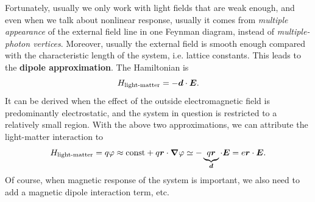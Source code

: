 \documentclass[hyperref, a4paper, 12pt]{report}
\newcommand*{\const}{\mathrm{const}}
\newcommand*{\concept}[1]{{\textbf{#1}}}
\begin{document}
Fortunately, usually we only work with light fields 
that are weak enough,
and even when we talk about nonlinear response,
usually it comes from \emph{multiple appearance} of the external field line in one Feynman diagram,
instead of \emph{multiple-photon vertices}.
Moreover, usually the external field is smooth enough 
compared with the characteristic length of the system, i.e. lattice constants.
This leads to the \concept{dipole approximation}.
The Hamiltonian is 
\begin{equation}
    H_{\text{light-matter}} = - \vb*{d} \cdot \vb*{E}.
\end{equation}
It can be derived when the effect of the outside electromagnetic field is predominantly electrostatic,
and the system in question is restricted to a relatively small region.
With the above two approximations,
we can attribute the light-matter interaction to 
\begin{equation}
    H_{\text{light-matter}} = q \varphi \approx \const + q \vb*{r} \cdot \grad{\varphi}
    \simeq - \underbrace{q \vb*{r}}_{\vb*{d}} \cdot \vb*{E}
    = e \vb*{r} \cdot \vb*{E}.
    \label{eq:light-matter.dipole-1}
\end{equation}
Of course, when magnetic response of the system is important, 
we also need to add a magnetic dipole interaction term, etc. 
\end{document}
